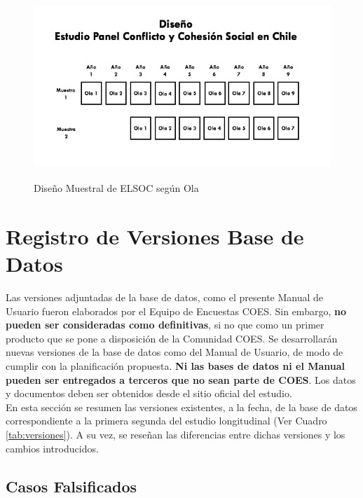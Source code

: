 \documentclass[12pt]{report}
\begin{document}
\begin{figure}[H]
	\begin{center}
		\caption{Diseño Muestral de ELSOC según Ola}
		\label{fig:sample}
		\includegraphics[width=15cm,height=7cm]{Sample_Design}
	\end{center}
\end{figure}


\newpage
\section*{Registro de Versiones Base de Datos}

Las versiones adjuntadas de la base de datos, como el presente Manual de Usuario fueron elaborados por el Equipo de Encuestas COES. Sin embargo, \textbf{no pueden ser consideradas como definitivas}, si no que como un primer producto que se pone a disposición de la Comunidad COES. Se desarrollarán nuevas versiones de la base de datos como del Manual de Usuario, de modo de cumplir con la planificación propuesta. 
\textbf{Ni las bases de datos ni el Manual pueden ser entregados a terceros que no sean parte de COES}. Los datos y documentos deben ser obtenidos desde el sitio oficial del estudio.\\

En esta sección se resumen las versiones existentes, a la fecha, de la base de datos correspondiente a la primera segunda del estudio longitudinal (Ver Cuadro \ref{tab:versiones}). A su vez, se reseñan las diferencias entre dichas versiones y los cambios introducidos.\\

\subsection*{Casos Falsificados}
\end{document}
